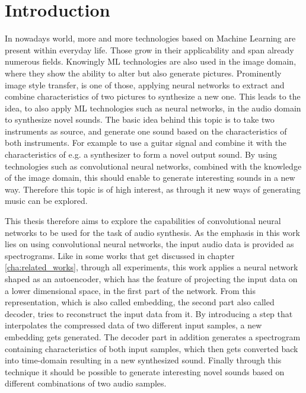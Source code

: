 \chapter{Introduction}
\label{cha:Introduction}

In nowadays world, more and more technologies based on Machine Learning are present within everyday life. Those grow in their applicability and span already numerous fields. Knowingly ML technologies are also used in the image domain, where they show the ability to alter but also generate pictures. Prominently image style transfer, is one of those, applying neural networks to extract and combine characteristics of two pictures to synthesize a new one. This leads to the idea, to also apply ML technologies such as neural networks, in the audio domain to synthesize novel sounds. The basic idea behind this topic is to take two instruments as source, and generate one sound based on the characteristics of both instruments. For example to use a guitar signal and combine it with the characteristics of e.g. a synthesizer to form a novel output sound. By using technologies such as convolutional neural networks, combined with the knowledge of the image domain, this should enable to generate interesting sounds in a new way. Therefore this topic is of high interest, as through it new ways of generating music can be explored. 

This thesis therefore aims to explore the capabilities of convolutional neural networks to be used for the task of audio synthesis. As the emphasis in this work lies on using convolutional neural networks, the input audio data is provided as spectrograms. Like in some works that get discussed in chapter \ref{cha:related_works}, through all experiments, this work applies a neural network shaped as an autoencoder, which has the feature of projecting the input data on a lower dimensional space, in the first part of the network. From this representation, which is also called embedding, the second part also called decoder, tries to reconstruct the input data from it. By introducing a step that interpolates the compressed data of two different input samples, a new embedding gets generated. The decoder part in addition generates a spectrogram containing characteristics of both input samples, which then gets converted back into time-domain resulting in a new synthesized sound. Finally through this technique it should be possible to generate interesting novel sounds based on different combinations of two audio samples.

